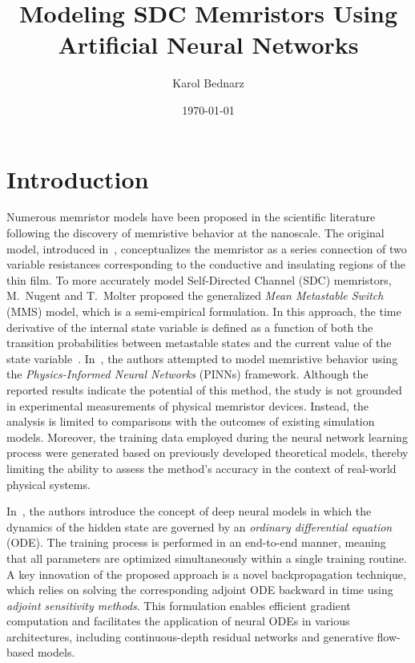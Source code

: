 \documentclass[11pt, oneside]{article}
\title{Modeling SDC Memristors Using Artificial Neural Networks}
\author{Karol Bednarz}
\date{\today}
\begin{document}
\maketitle
\tableofcontents

\vspace{.25in}

\newcommand{\Todo}[1]{\textcolor{red}{\textbf{TODO:} #1}}

\section{Introduction}


Numerous memristor models have been proposed in the scientific literature following the discovery of memristive behavior at the nanoscale. The original model, introduced in~\cite{Strukov2008}, conceptualizes the memristor as a series connection of two variable resistances corresponding to the conductive and insulating regions of the thin film. To more accurately model Self-Directed Channel (SDC) memristors, M.~Nugent and T.~Molter proposed the generalized \textit{Mean Metastable Switch} (MMS) model, which is a semi-empirical formulation. In this approach, the time derivative of the internal state variable is defined as a function of both the transition probabilities between metastable states and the current value of the state variable~\cite{Molter2016}. In~\cite{Lee2024}, the authors attempted to model memristive behavior using the \textit{Physics-Informed Neural Networks} (PINNs) framework. Although the reported results indicate the potential of this method, the study is not grounded in experimental measurements of physical memristor devices. Instead, the analysis is limited to comparisons with the outcomes of existing simulation models. Moreover, the training data employed during the neural network learning process were generated based on previously developed theoretical models, thereby limiting the ability to assess the method's accuracy in the context of real-world physical systems.



In~\cite{Ricky2018}, the authors introduce the concept of deep neural models in which the dynamics of the hidden state are governed by an \textit{ordinary differential equation} (ODE). The training process is performed in an end-to-end manner, meaning that all parameters are optimized simultaneously within a single training routine. A key innovation of the proposed approach is a novel backpropagation technique, which relies on solving the corresponding adjoint ODE backward in time using \textit{adjoint sensitivity methods}. This formulation enables efficient gradient computation and facilitates the application of neural ODEs in various architectures, including continuous-depth residual networks and generative flow-based models.
\end{document}
